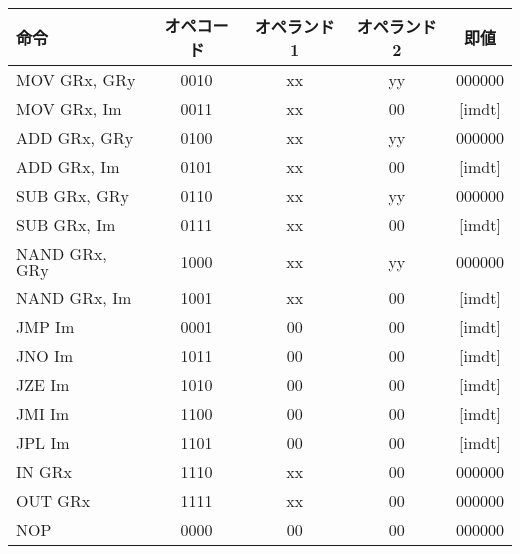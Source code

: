 \documentclass[lualatex,js=standard,hiresbb,openany]{bxjsarticle}
\begin{document}
\begin{table}[H]
 \begin{center}
  \begin{tabular}{lcccc}\hline
    命令                                & オペコード & オペランド1 & オペランド2 & 即値\\
    \hline \hline 
    MOV  $\mathrm{GRx}$, $\mathrm{GRy}$ &   0010    &   xx   &   yy   &    000000 \\
    MOV  $\mathrm{GRx}$, Im             &   0011    &   xx   &   00   &    [imdt] \\
    ADD  $\mathrm{GRx}$, $\mathrm{GRy}$ &   0100    &   xx   &   yy   &    000000 \\
    ADD  $\mathrm{GRx}$, Im             &   0101    &   xx   &   00   &    [imdt] \\
    SUB  $\mathrm{GRx}$, $\mathrm{GRy}$ &   0110    &   xx   &   yy   &    000000 \\
    SUB  $\mathrm{GRx}$, Im             &   0111    &   xx   &   00   &    [imdt] \\
    NAND $\mathrm{GRx}$, $\mathrm{GRy}$ &   1000    &   xx   &   yy   &    000000 \\
    NAND $\mathrm{GRx}$, Im             &   1001    &   xx   &   00   &    [imdt] \\
    JMP  Im                             &   0001    &   00   &   00   &    [imdt] \\
    JNO  Im                             &   1011    &   00   &   00   &    [imdt] \\
    JZE  Im                             &   1010    &   00   &   00   &    [imdt] \\
    JMI  Im                             &   1100    &   00   &   00   &    [imdt] \\
    JPL  Im                             &   1101    &   00   &   00   &    [imdt] \\
    IN   $\mathrm{GRx}$                 &   1110    &   xx   &   00   &    000000 \\
    OUT  $\mathrm{GRx}$                 &   1111    &   xx   &   00   &    000000 \\
    NOP                                 &   0000    &   00   &   00   &    000000 \\  
    \hline                          
  \end{tabular}
  \label{tab:}
 \end{center}
\end{table}
\end{document}
